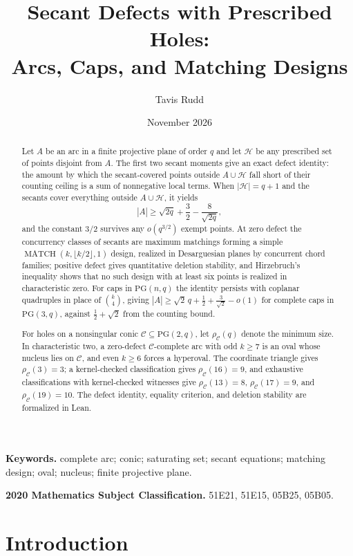 \documentclass[11pt]{article}
\title{Secant Defects with Prescribed Holes:\\
Arcs, Caps, and Matching Designs}
\author{Tavis Rudd}
\date{November 2026}
\theoremstyle{definition}
\theoremstyle{remark}
\newcommand{\PG}{\mathrm{PG}}
\newcommand{\cC}{\mathcal{C}}
\newcommand{\cH}{\mathcal{H}}
\newcommand{\rhoC}{\rho_{\cC}}
\begin{document}
\maketitle

\begin{abstract}
Let \(A\) be an arc in a finite projective plane of order \(q\) and let
\(\cH\) be any prescribed set of points disjoint from \(A\).  The first two
secant moments give an exact defect identity: the amount by which the
secant-covered points outside \(A\cup\cH\) fall short of their counting
ceiling is a sum of nonnegative local terms.  When
\(|\cH|=q+1\) and the secants cover everything outside \(A\cup\cH\), it
yields
\[
 |A|\ge \sqrt{2q}+\frac32-\frac8{\sqrt{2q}},
\]
and the constant \(3/2\) survives any \(o(q^{3/2})\) exempt points.  At zero
defect the concurrency classes of secants are maximum matchings forming a
simple \(\operatorname{MATCH}(k,\lfloor k/2\rfloor,1)\) design, realized in
Desarguesian planes by concurrent chord families; positive defect gives
quantitative deletion stability, and Hirzebruch's inequality shows that no
such design with at least six points is realized in characteristic zero.
For caps in \(\PG(n,q)\) the identity persists with coplanar quadruples in
place of \(\binom{k}{4}\), giving
\(|A|\ge\sqrt2\,q+\frac12+\frac3{\sqrt2}-o(1)\) for complete caps in
\(\PG(3,q)\), against \(\frac12+\sqrt2\) from the counting bound.

For holes on a nonsingular conic \(\cC\subseteq\PG(2,q)\), let \(\rhoC(q)\)
denote the minimum size.  In characteristic two, a zero-defect
\(\cC\)-complete arc with odd \(k\ge7\) is an oval whose nucleus lies on
\(\cC\), and even \(k\ge6\) forces a hyperoval.  The coordinate triangle
gives \(\rhoC(3)=3\); a kernel-checked classification gives \(\rhoC(16)=9\),
and exhaustive classifications with kernel-checked witnesses give
\(\rhoC(13)=8\), \(\rhoC(17)=9\), and \(\rhoC(19)=10\).  The defect
identity, equality criterion, and deletion stability are formalized in Lean.
\end{abstract}

\noindent\textbf{Keywords.} complete arc; conic; saturating set; secant
equations; matching design; oval; nucleus; finite projective plane.

\smallskip
\noindent\textbf{2020 Mathematics Subject Classification.} 51E21, 51E15,
05B25, 05B05.

\section{Introduction}
\end{document}
